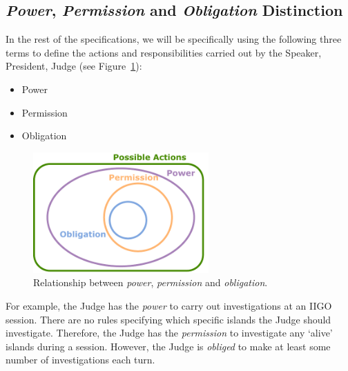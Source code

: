 \subsection{\emph{Power}, \emph{Permission} and \emph{Obligation} Distinction}
In the rest of the specifications, we will be specifically using the following three terms to define the actions and responsibilities carried out by the Speaker, President, Judge (see Figure~\ref{fig:per_obl_sets}):
\begin{itemize}
    \item Power
    \item Permission
    \item Obligation
\end{itemize}



\begin{figure}[H]
\centering
\includegraphics[width=0.6\textwidth]{05_iigo/images/SOMAS_per_obl.pdf}
\caption{Relationship between \emph{power}, \emph{permission} and \emph{obligation}.}
\label{fig:per_obl_sets}
\end{figure}


For example, the Judge has the \emph{power} to carry out investigations at an IIGO session. There are no rules specifying which specific islands the Judge should investigate. Therefore, the Judge has the \emph{permission} to investigate any `alive' islands during a session. However, the Judge is \emph{obliged} to make at least some number of investigations each turn.



